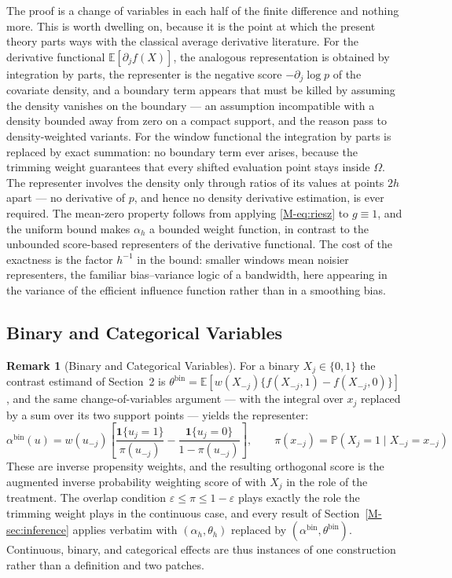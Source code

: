 \documentclass[12pt,a4paper]{article}
\numberwithin{equation}{section}
\theoremstyle{plain}
\theoremstyle{definition}
\newtheorem{remark}{Remark}
\newcommand{\E}{\mathbb{E}}
\newcommand{\Prob}{\mathbb{P}}
\begin{document}
	The proof is a change of variables in each half of the finite difference and nothing
	more. This is worth dwelling on, because it is the point at which the present theory
	parts ways with the classical average derivative literature. For the derivative
	functional $\E[\partial_j f(X)]$, the analogous representation is obtained by
	integration by parts, the representer is the negative score $-\partial_j \log p$ of
	the covariate density, and a boundary term appears that must be killed by assuming
	the density vanishes on the boundary --- an assumption incompatible with a density
	bounded away from zero on a compact support, and the reason
	\citet{powell1989} pass to density-weighted variants. For the window functional the
	integration by parts is replaced by exact summation: no boundary term ever arises,
	because the trimming weight guarantees that every shifted evaluation point stays
	inside $\Omega$. The representer involves the density only through ratios of its
	values at points $2h$ apart --- no derivative of $p$, and hence no density
	derivative estimation, is ever required. The mean-zero property follows from
	applying \eqref{M-eq:riesz} to $g \equiv 1$, and the uniform bound makes $\alpha_h$ a
	bounded weight function, in contrast to the unbounded score-based representers of
	the derivative functional. The cost of the exactness is the factor $h^{-1}$ in the
	bound: smaller windows mean noisier representers, the familiar bias--variance logic
	of a bandwidth, here appearing in the variance of the efficient influence function
	rather than in a smoothing bias.
	

	\subsection{Binary and Categorical Variables}

	\begin{remark}[Binary and Categorical Variables]
		\label{rem:binary}
		For a binary $X_j \in \{0,1\}$ the contrast estimand of Section~2 is
		$\theta^{\mathrm{bin}} = \E[w(X_{-j})\{f(X_{-j}, 1) - f(X_{-j}, 0)\}]$, and the
		same change-of-variables argument --- with the integral over $x_j$ replaced by a
		sum over its two support points --- yields the representer:
		\begin{equation}
			\alpha^{\mathrm{bin}}(u) = w(u_{-j})\left[
			\frac{\mathbf{1}\{u_j = 1\}}{\pi(u_{-j})}
			- \frac{\mathbf{1}\{u_j = 0\}}{1 - \pi(u_{-j})}\right],
			\qquad \pi(x_{-j}) = \Prob(X_j = 1 \mid X_{-j} = x_{-j})
		\end{equation}
		These are inverse propensity weights, and the resulting orthogonal score is the
		augmented inverse probability weighting score of \citet{robins1994} with $X_j$
		in the role of the treatment. The overlap condition
		$\varepsilon \leq \pi \leq 1 - \varepsilon$ plays exactly the role the trimming
		weight plays in the continuous case, and every result of
		Section~\ref{M-sec:inference} applies verbatim with
		$(\alpha_h, \theta_h)$ replaced by
		$(\alpha^{\mathrm{bin}}, \theta^{\mathrm{bin}})$. Continuous, binary, and
		categorical effects are thus instances of one construction rather than a
		definition and two patches.
	\end{remark}
\end{document}
